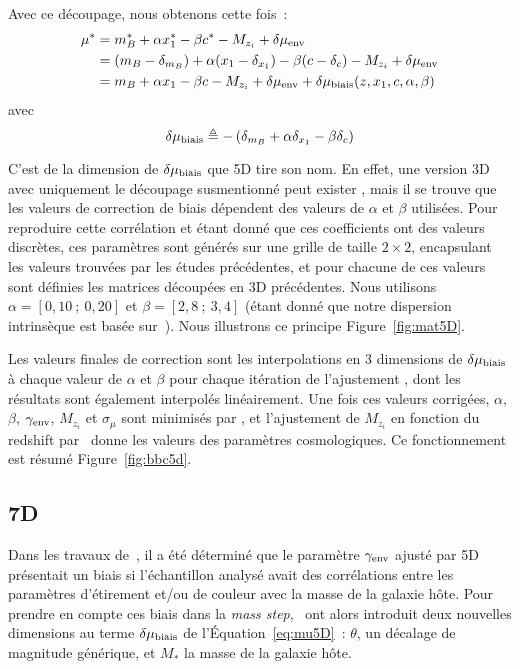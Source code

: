 \documentclass[../main/main.tex]{subfiles}
\begin{document}
Avec ce découpage, nous obtenons cette fois~:
\begin{align}\label{eq:mu5D}
    \mu^* & = m_B^* + \alpha x_1^* - \beta c^* - M_{z_i}
            + \delta\mu_{\rm env} \nonumber\\
          & = (m_B - \delta_{m_B}) + \alpha (x_1 - \delta_{x_1}) - \beta(c-\delta_c)
            - M_{z_i} + \delta\mu_{\rm env} \nonumber\\
          & = m_B + \alpha x_1 - \beta c - M_{z_i}
            + \delta\mu_{\rm env} + \delta\mu_{\rm biais}(z, x_1, c, \alpha, \beta)
\end{align}
avec
\begin{equation}\label{eq:bias5D}
    \delta\mu_{\rm biais} \triangleq
        - \left(\delta_{m_B} + \alpha \delta_{x_1} - \beta\delta_c\right)
\end{equation}

C'est de la dimension de $\delta\mu_{\rm biais}$ que \bbc5D tire son nom. En
effet, une version 3D avec uniquement le découpage susmentionné peut exister
\citep{scolnic2016}, mais il se trouve que les valeurs de correction de biais
dépendent des valeurs de $\alpha$ et $\beta$ utilisées. Pour reproduire cette
corrélation et étant donné que ces coefficients ont des valeurs discrètes, ces
paramètres sont générés sur une grille de taille $2\times2$, encapsulant les
valeurs trouvées par les études précédentes, et pour chacune de ces valeurs sont
définies les matrices découpées en 3D précédentes. Nous utilisons $\alpha =
[0,10~;~0,20]$ et $\beta = [2,8~;~3,4]$ (étant donné que notre dispersion
intrinsèque est basée sur~). Nous illustrons ce principe
Figure~\ref{fig:mat5D}.

Les valeurs finales de correction sont les interpolations en 3 dimensions de
$\delta\mu_{\rm biais}$ à chaque valeur de $\alpha$ et $\beta$ pour chaque
itération de l'ajustement \bbc, dont les résultats sont également interpolés
linéairement. Une fois ces valeurs corrigées, $\alpha$, $\beta$, $\gamma_{\rm
env}$, $M_{z_i}$ et $\sigma_{\mu}$ sont minimisés par \saltmu, et l'ajustement
de $M_{z_i}$ en fonction du redshift par \wfit\ donne les valeurs des paramètres
cosmologiques. Ce fonctionnement est résumé Figure~\ref{fig:bbc5d}.

\subsection{\bbc7D}\label{ssec:bbc7D}

Dans les travaux de~\cite{smith2020}, il a été déterminé que le paramètre
$\gamma_{\rm env}$ ajusté par \bbc5D présentait un biais si l'échantillon
analysé avait des corrélations entre les paramètres d'étirement et/ou de couleur
avec la masse de la galaxie hôte. Pour prendre en compte ces biais dans la
\textit{mass step},~\cite{popovic2021a} ont alors introduit deux nouvelles
dimensions au terme $\delta\mu_{\rm biais}$ de l'Équation~\ref{eq:mu5D}~:
$\theta$, un décalage de magnitude générique, et $M_*$ la masse de la galaxie
hôte.
\end{document}

